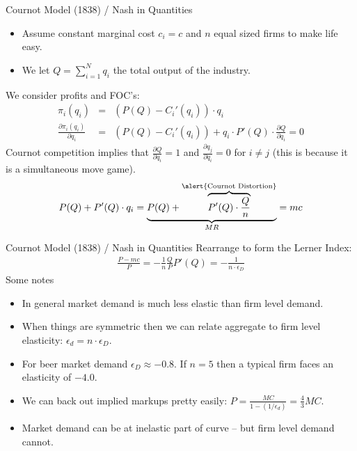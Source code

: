 \documentclass[aspectratio=169,11pt]{beamer}
\begin{document}
\begin{frame}{Cournot Model (1838) / Nash in Quantities}
\small
\begin{itemize}
\item Assume constant marginal cost $c_i = c$ and $n$ equal sized firms to make life easy. 
\item We let $Q=\sum_{i=1}^N q_i$ the total output of the industry.
\end{itemize}
We consider profits and FOC's:
\begin{eqnarray*}
\pi_i(q_i) &=& (P(Q) - C_i'(q_i) ) \cdot q_i\\
\frac{\partial \pi_i(q_i)}{\partial q_i} &=& (P(Q) - C_i'(q_i))  +  q_i  \cdot P'(Q) \cdot \frac{\partial Q}{\partial q_i}  = 0
\end{eqnarray*}
Cournot competition implies that $\frac{\partial Q}{\partial q_i} = 1$ and $\frac{\partial q_j}{\partial q_i} = 0$ for $i \neq j$ (this is because it is a simultaneous move game).
\begin{eqnarray*}
P(Q) + P'(Q) \cdot q_i = \underbrace{P(Q) + \overbrace{P'(Q) \cdot \frac{Q}{n}}^{\text{\alert{Cournot Distortion}}}}_{MR} =  mc
\end{eqnarray*}
\end{frame}

\begin{frame}{Cournot Model (1838) / Nash in Quantities}
Rearrange to form the Lerner Index:
\begin{eqnarray*}
\frac{P-mc}{P} = - \frac{1}{n} \frac{Q}{P} P'(Q) = - \frac{1}{n \cdot \epsilon_D}
\end{eqnarray*}
Some notes
\begin{itemize}
\item In general market demand is much less elastic than firm level demand.
\item When things are symmetric then we can relate aggregate to firm level elasticity: $\epsilon_d = n \cdot \epsilon_D$.
\item For beer market demand $\epsilon_D \approx -0.8$. If $n=5$ then a typical firm faces an elasticity of $-4.0$.
\item We can back out implied markups pretty easily: $P  = \frac{MC}{1-(1/\epsilon_d)}  = \frac{4}{3} MC$.
\item Market demand can be at inelastic part of curve -- but firm level demand cannot.
\end{itemize}
\end{frame}
\end{document}
